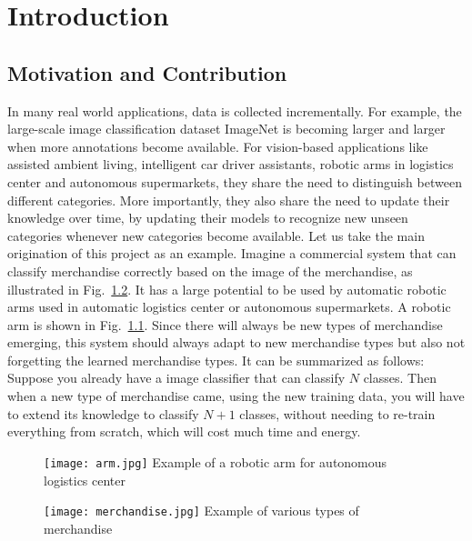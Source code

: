 
\chapter{Introduction}
\label{chap:intro}
\section{Motivation and Contribution}
In many real world applications, data is collected incrementally. For example, the large-scale image classification dataset ImageNet is becoming larger and larger when more annotations become available. For vision-based applications like assisted ambient living, intelligent car driver assistants, robotic arms in logistics center and autonomous supermarkets, they share the need to distinguish between different categories. More importantly, they also share the need to update their knowledge over time, by updating their models to recognize new unseen categories whenever new categories become available. Let us take the main origination of this project as an example. Imagine a commercial system that can classify merchandise correctly based on the image of the merchandise, as illustrated in Fig.~\ref{fig:merchandise}. It has a large potential to be used by automatic robotic arms used in automatic logistics center or autonomous supermarkets. A robotic arm is shown in Fig.~\ref{fig:arm}. Since there will always be new types of merchandise emerging, this system should always adapt to new merchandise types but also not forgetting the learned merchandise types. It can be summarized as follows: Suppose you already have a image classifier that can classify $N$ classes. Then when a new type of merchandise came, using the new training data, you will have to extend its knowledge to classify $N+1$ classes, without needing to re-train everything from scratch, which will cost much time and energy.

\begin{figure}[!htp]
	\centering
	\texttt{[image: arm.jpg]}
	{Example of a robotic arm for autonomous logistics center}
	\label{fig:arm}
\end{figure}
\begin{figure}[!htp]
	\centering
	\texttt{[image: merchandise.jpg]}
	{Example of various types of merchandise}
	\label{fig:merchandise}
\end{figure}

